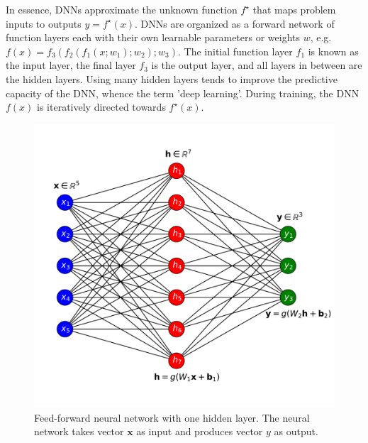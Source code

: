 In essence, DNNs approximate the unknown function $f^{\star}$ that maps problem inputs to outputs $y = f^{\star}(x)$. DNNs are organized as a forward network of function layers each with their own learnable parameters or weights $w$, e.g. $f(x) = f_3(f_2(f_1(x;w_1);w_2);w_3)$. The initial function layer $f_1$ is known as the input layer, the final layer $f_3$ is the output layer, and all layers in between are the hidden layers. Using many hidden layers tends to improve the predictive capacity of the DNN, whence the term 'deep learning'. During training, the DNN $f(x)$ is iteratively directed towards $f^{\star}(x)$.

\begin{figure}[t]
\centering
\includegraphics[scale=.35]{figures/network.pdf}
\caption{Feed-forward neural network with one hidden layer. The neural network takes vector $\mathbf{x}$ as input and produces vector $y$ as output.}
\label{fig:net}       %
\end{figure}

